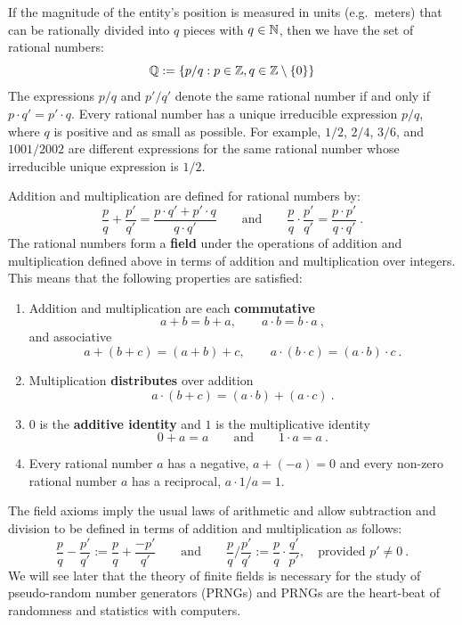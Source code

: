 If the magnitude of the entity's position is measured in units (e.g.~meters) that can be rationally divided into $q$ pieces with $q \in \mathbb{N}$, then we have the set of rational numbers:
\[
\mathbb{Q} := \{ {p}/{q} : p \in \mathbb{Z}, q \in \mathbb{Z} \setminus \{0\} \}
\] 
The expressions $p/q$ and $p'/q'$ denote the same rational number if and only if $p \cdot q'=p' \cdot q$.  Every rational number has a unique irreducible expression $p/q$, where $q$ is positive and as small as possible.  For example, $1/2$, $2/4$, $3/6$, and $1001/2002$ are different expressions for the same rational number whose irreducible unique expression is $1/2$.

Addition and multiplication are defined for rational numbers by:
\[
\frac{p}{q} + \frac{p'}{q'} = \frac{p \cdot q' + p' \cdot q}{q \cdot q'}
\qquad \text{and} \qquad \frac{p}{q} \cdot \frac{p'}{q'} = \frac{p \cdot p'}{q \cdot q'} \ .
\]
The rational numbers form a {\bf field} under the operations of addition and multiplication defined above in terms of addition and multiplication over integers.  This means that the following properties are satisfied:
\begin{enumerate}
\item Addition and multiplication are each {\bf commutative} 
\[ a+b = b+a, \qquad a \cdot b = b \cdot a \ , \]
and associative
\[
a + (b + c) = (a + b) + c, \qquad a \cdot (b \cdot c) = (a \cdot b) \cdot c \ .
\]
\item Multiplication {\bf distributes} over addition
\[
a \cdot (b+c) = (a \cdot b) + (a \cdot c) \ .
\]
\item $0$ is the {\bf additive identity} and $1$ is the multiplicative identity
\[
0+a=a \qquad \text{and} \qquad 1 \cdot a = a \ .
\]
\item Every rational number $a$ has a negative, $a+(-a)=0$ and every non-zero rational number $a$ has a reciprocal, $a \cdot 1/a = 1$.
\end{enumerate} 
The field axioms imply the usual laws of arithmetic and allow subtraction and division to be defined in terms of addition and multiplication as follows:
\[
\frac{p}{q} - \frac{p'}{q'} := \frac{p}{q} + \frac{-p'}{q'}
\qquad \text{and} \qquad  \frac{p}{q} / \frac{p'}{q'} := \frac{p}{q} \cdot \frac{q'}{p'}, \quad \text{provided $p' \neq 0$} \ .
\]
We will see later that the theory of finite fields is necessary for the study of pseudo-random number generators (PRNGs) and PRNGs are the heart-beat of randomness and statistics with computers.  


